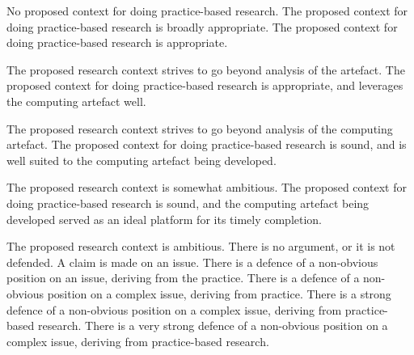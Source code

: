 \documentclass{../../fal_assignment}
\begin{document}
\begin{markingrubric}
%
        \grade\fail No proposed context for doing practice-based research.
        \grade The proposed context for doing practice-based research is broadly appropriate.
        \grade The proposed context for doing practice-based research is appropriate.
        \par The proposed research context strives to go beyond analysis of the artefact.
        \grade The proposed context for doing practice-based research is appropriate, and leverages the computing artefact well.
        \par The proposed research context strives to go beyond analysis of the computing artefact.
        \grade The proposed context for doing practice-based research is sound, and is well suited to the computing artefact being developed.
        \par The proposed research context is somewhat ambitious.
        \grade The proposed context for doing practice-based research is sound, and the computing artefact being developed served as an ideal platform for its timely completion. 
        \par The proposed research context is ambitious.
%
        \grade\fail There is no argument, or it is not defended.
        \grade A claim is made on an issue.
        \grade There is a defence of a non-obvious position on an issue, deriving from the practice.
        \grade There is a defence of a non-obvious position on a complex issue, deriving from practice.
        \grade There is a strong defence of a non-obvious position on a complex issue, deriving from practice-based research.
        \grade There is a very strong defence of a non-obvious position on a complex issue, deriving from practice-based research.
%

\end{markingrubric}
\end{document}
